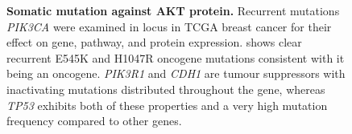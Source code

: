 \begin{figure}[!ht]
\begin{mdframed}
\begin{center}
    \end{center}
    \caption[Somatic mutation against AKT protein]{\small \textbf{Somatic mutation against AKT protein.} Recurrent mutations \textit{PIK3CA} were examined in locus in TCGA breast cancer for their effect on gene, pathway, and protein expression. shows clear recurrent E545K and H1047R oncogene mutations consistent with it being an oncogene. \textit{PIK3R1} and \textit{CDH1} are tumour suppressors with inactivating mutations distributed throughout the gene, whereas \textit{TP53} exhibits both of these properties and a very high mutation frequency compared to other genes.
}
\label{fig:mutation_expr_prot2}
\end{mdframed}
\end{figure}

